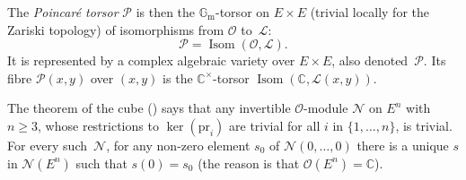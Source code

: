 \documentclass[11pt]{article}
\providecommand{\C}{}
\providecommand{\G}{}
\let\mathcal\mathscr
\theoremstyle{plain}
\theoremstyle{definition}
\numberwithin{equation}{subsection}
\renewcommand{\C}{\mathbb C}
\renewcommand{\G}{\mathbb G}
\newcommand{\calL}{\mathcal{L}}
\newcommand{\calN}{\mathcal{N}}
\newcommand{\calO}{\mathcal{O}}
\newcommand{\calP}{\mathcal{P}}
\newcommand{\Gm}{\G_{\mathrm{m}}}
\newcommand{\pr}{\mathrm{pr}}
\DeclareMathOperator{\Isom}{Isom}
\begin{document}
The \emph{Poincaré torsor} $\calP$ is then the $\Gm$-torsor on
$E\times E$ (trivial locally for the Zariski topology) of isomorphisms
from $\calO$ to~$\calL$:
\begin{equation}\label{eqn:defPtorsor}
\calP = \Isom(\calO,\calL).
\end{equation}
It is represented by a complex algebraic variety over $E\times E$,
also denoted~$\calP$. Its fibre $\calP(x,y)$ over $(x,y)$ is
the $\C^\times$-torsor $\Isom(\C,\calL(x,y))$.

The theorem of the cube (\cite[\S 6]{MumfordAV}) says that any
invertible $\calO$-module $\calN$ on $E^n$ with $n\geq3$, whose
restrictions to $\ker(\pr_i)$ are trivial for all $i$ in
$\{1,\ldots,n\}$, is trivial. For every such~$\calN$, for any non-zero
element $s_0$ of $\calN(0,\ldots,0)$ there is a unique $s$ in
$\calN(E^n)$ such that $s(0)=s_0$ (the reason is that
$\calO(E^n)=\C$).
\end{document}
